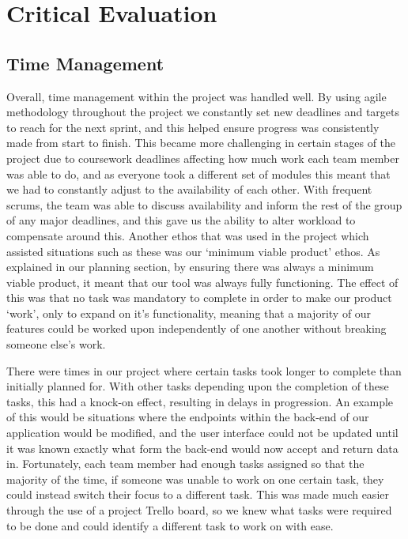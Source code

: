 \chapter{Critical Evaluation} \label{chapter:Critical Evaluation}

\section{Time Management}
Overall, time management within the project was handled well. By using agile methodology throughout the project we constantly set new deadlines and targets to reach for the next sprint, and this helped ensure progress was consistently made from start to finish. This became more challenging in certain stages of the project due to coursework deadlines affecting how much work each team member was able to do, and as everyone took a different set of modules this meant that we had to constantly adjust to the availability of each other. With frequent scrums, the team was able to discuss availability and inform the rest of the group of any major deadlines, and this gave us the ability to alter workload to compensate around this. Another ethos that was used in the project which assisted situations such as these was our ‘minimum viable product’ ethos. As explained in our planning section, by ensuring there was always a minimum viable product, it meant that our tool was always fully functioning. The effect of this was that no task was mandatory to complete in order to make our product ‘work’, only to expand on it’s functionality, meaning that a majority of our features could be worked upon independently of one another without breaking someone else’s work.

There were times in our project where certain tasks took longer to complete than initially planned for. With other tasks depending upon the completion of these tasks, this had a knock-on effect, resulting in delays in progression. An example of this would be situations where the endpoints within the back-end of our application would be modified, and the user interface could not be updated until it was known exactly what form the back-end would now accept and return data in. Fortunately, each team member had enough tasks assigned so that the majority of the time, if someone was unable to work on one certain task, they could instead switch their focus to a different task. This was made much easier through the use of a project Trello board, so we knew what tasks were required to be done and could identify a different task to work on with ease.

